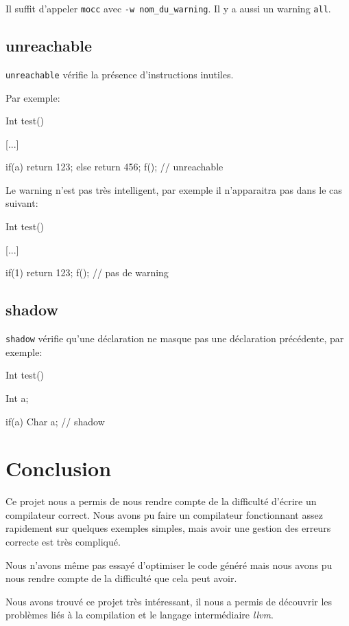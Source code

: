 \documentclass{scrartcl}
\newcommand{\mocc}{\texttt{mocc}}
\newcommand{\llvm}{\textit{llvm}}
\begin{document}
  Il suffit d'appeler \mocc{} avec \verb+-w nom_du_warning+.
  Il y a aussi un warning \verb+all+.

  \subsection{unreachable}
    \verb"unreachable" vérifie la présence d'instructions inutiles.

    Par exemple:
    \begin{moccode}
Int test() {
    [...]

    if(a) {
        return 123;
    }
    else {
        return 456;
    }
    f(); // unreachable
}
    \end{moccode}

    Le warning n'est pas très intelligent, par exemple il n'apparaitra pas dans
    le cas suivant:
    \begin{moccode}
Int test() {
    [...]

    if(1) {
        return 123;
    }
    f(); // pas de warning
}
    \end{moccode}

  \subsection{shadow}
    \verb"shadow" vérifie qu'une déclaration ne masque pas une déclaration
    précédente, par exemple:
    \begin{moccode}
Int test() {
    Int a;

    if(a) {
        Char a; // shadow
    }
}
    \end{moccode}

\section{Conclusion}
  Ce projet nous a permis de nous rendre compte de la difficulté d'écrire un
  compilateur correct. Nous avons pu faire un compilateur fonctionnant assez
  rapidement sur quelques exemples simples, mais avoir une gestion des erreurs
  correcte est très compliqué.

  Nous n'avons même pas essayé d'optimiser le code généré mais nous avons pu
  nous rendre compte de la difficulté que cela peut avoir.

  Nous avons trouvé ce projet très intéressant, il nous a permis de découvrir
  les problèmes liés à la compilation et le langage intermédiaire \llvm{}.
\end{document}
